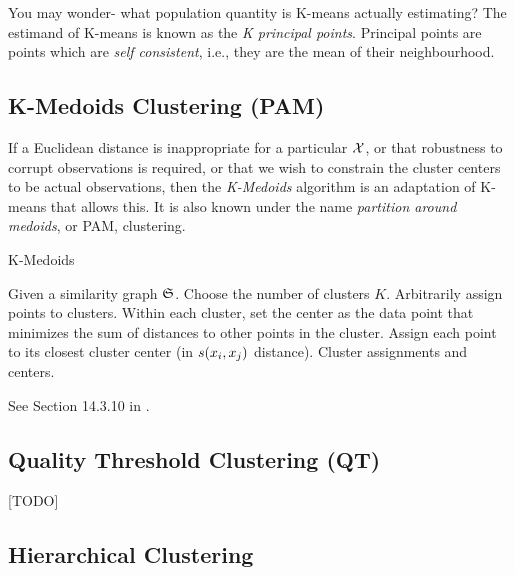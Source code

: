 \begin{remark}
You may wonder- what population quantity is K-means actually estimating?
The estimand of K-means is known as the \emph{K principal points}.
Principal points are points which are \emph{self consistent}, i.e., they are the mean of their neighbourhood. 
\end{remark}




\subsection{K-Medoids Clustering (PAM)}
\label{sec:k_medoids}



If a Euclidean distance is inappropriate for a particular $\mathcal{X}$, or that robustness to corrupt observations is required, or that we wish to constrain the cluster centers to be actual observations, then the \emph{K-Medoids} algorithm is an adaptation of K-means that allows this.
It is also known under the name \emph{partition around medoids}, or PAM, clustering.

\begin{algorithm}[H]
\caption{K-Medoids}
\begin{algorithmic}
\State Given a similarity graph $\mathfrak{S}$.
\State Choose the number of clusters $K$.
\State Arbitrarily assign points to clusters.
	\State Within each cluster, set the center as the data point that minimizes the sum of distances to other points in the cluster.
	\State Assign each point to its closest cluster center (in $s(x_i,x_j)$ distance).
\EndWhile
\State \Return Cluster assignments and centers.
\end{algorithmic}
\end{algorithm}


See Section 14.3.10 in \cite{hastie_elements_2003}.




\subsection{Quality Threshold Clustering (QT)}
[TODO]
\label{sec:qt_clustering}



\subsection{Hierarchical Clustering}
\label{sec:hierarchical}

